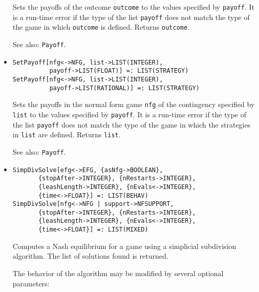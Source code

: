 \begin{itemize}
\bd
Sets the payoffs of the outcome \verb+outcome+ to the
values specified by \verb+payoff+.  It is a run-time error if the type
of the list \verb+payoff+ does not match the type of the game in which
\verb+outcome+ is defined.  Returns \verb+outcome+.
\item
[See also:] {\tt Payoff}.
\ed

\item
\protect \large \begin{verbatim}
SetPayoff[nfg<->NFG, list->LIST(INTEGER),
          payoff->LIST(FLOAT)] =: LIST(STRATEGY)
SetPayoff[nfg<->NFG, list->LIST(INTEGER), 
          payoff->LIST(RATIONAL)] =: LIST(STRATEGY)
\end{verbatim}\normalsize

\bd
Sets the payoffs in the normal form game \verb+nfg+ of the
contingency specified by \verb+list+ to the values specified by
\verb+payoff+.  It is a run-time error if the type of the list
\verb+payoff+ does not match the type of the game in which the
strategies in \verb+list+ are defined.  Returns \verb+list+.
\item
[See also:] {\tt Payoff}.  
\ed

\item
\protect \large \begin{verbatim}
SimpDivSolve[efg<->EFG, {asNfg->BOOLEAN}, 
       {stopAfter->INTEGER}, {nRestarts->INTEGER}, 
       {leashLength->INTEGER}, {nEvals<->INTEGER}, 
       {time<->FLOAT}] =: LIST(BEHAV)
SimpDivSolve[nfg<->NFG | support->NFSUPPORT, 
       {stopAfter->INTEGER}, {nRestarts->INTEGER}, 
       {leashLength->INTEGER}, {nEvals<->INTEGER}, 
       {time<->FLOAT}] =: LIST(MIXED)
\end{verbatim}\normalsize

\bd
Computes a Nash equilibrium for a game using a simplicial subdivision
algorithm.  The list of solutions found is returned.

The behavior of the algorithm may be modified by several optional
parameters:


\end{itemize}
